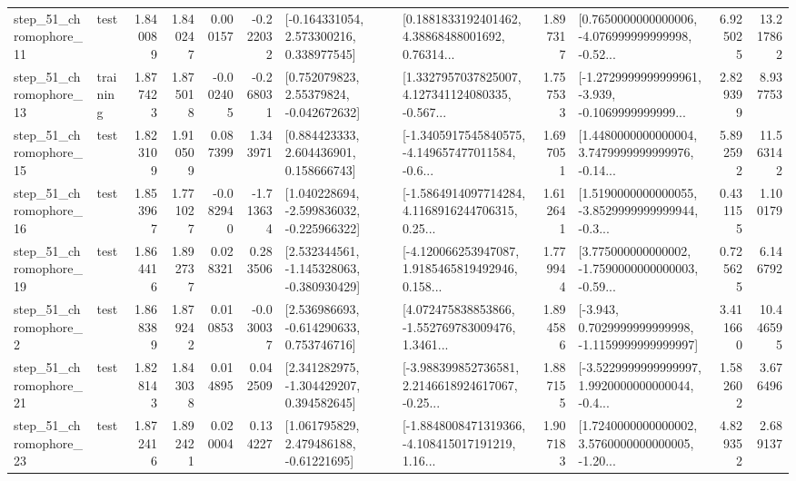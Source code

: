 \begin{tabular}{llrrrrllrlrr}
   step\_51\_chromophore\_11 &      test &      1.840089 &    1.840247 &      0.000157 & -0.222032 &    [-0.164331054, 2.573300216, 0.338977545] &  [0.1881833192401462, 4.38868488001692, 0.76314... &       1.897317 &  [0.7650000000000006, -4.076999999999998, -0.52... &            6.925025 &         13.217862 \\
   step\_51\_chromophore\_13 &  training &      1.877423 &    1.875018 &     -0.002405 & -0.268031 &     [0.752079823, 2.55379824, -0.042672632] &  [1.3327957037825007, 4.127341124080335, -0.567... &       1.757533 &  [-1.2729999999999961, -3.939, -0.1069999999999... &            2.829399 &          8.937753 \\
   step\_51\_chromophore\_15 &      test &      1.823109 &    1.910509 &      0.087399 &  1.343971 &     [0.884423333, 2.604436901, 0.158666743] &  [-1.3405917545840575, -4.149657477011584, -0.6... &       1.697051 &  [1.4480000000000004, 3.7479999999999976, -0.14... &            5.892592 &         11.563142 \\
   step\_51\_chromophore\_16 &      test &      1.853967 &    1.771027 &     -0.082940 & -1.713634 &   [1.040228694, -2.599836032, -0.225966322] &  [-1.5864914097714284, 4.1168916244706315, 0.25... &       1.612641 &  [1.5190000000000055, -3.8529999999999944, -0.3... &            0.431155 &          1.100179 \\
   step\_51\_chromophore\_19 &      test &      1.864416 &    1.892737 &      0.028321 &  0.283506 &   [2.532344561, -1.145328063, -0.380930429] &  [-4.120066253947087, 1.9185465819492946, 0.158... &       1.779944 &  [3.775000000000002, -1.7590000000000003, -0.59... &            0.725625 &          6.146792 \\
    step\_51\_chromophore\_2 &      test &      1.868389 &    1.879242 &      0.010853 & -0.030037 &    [2.536986693, -0.614290633, 0.753746716] &  [4.072475838853866, -1.552769783009476, 1.3461... &       1.894586 &  [-3.943, 0.7029999999999998, -1.1159999999999997] &            3.411660 &         10.446595 \\
   step\_51\_chromophore\_21 &      test &      1.828143 &    1.843038 &      0.014895 &  0.042509 &    [2.341282975, -1.304429207, 0.394582645] &  [-3.988399852736581, 2.2146618924617067, -0.25... &       1.887155 &  [-3.5229999999999997, 1.9920000000000044, -0.4... &            1.582602 &          3.676496 \\
   step\_51\_chromophore\_23 &      test &      1.872416 &    1.892421 &      0.020004 &  0.134227 &     [1.061795829, 2.479486188, -0.61221695] &  [-1.8848008471319366, -4.108415017191219, 1.16... &       1.907183 &  [1.7240000000000002, 3.5760000000000005, -1.20... &            4.829352 &          2.689137 \\

\end{tabular}
